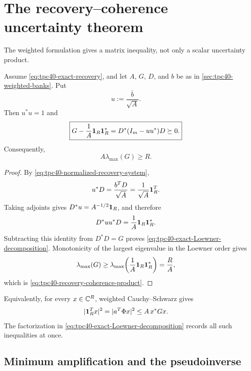 \section{The recovery--coherence uncertainty theorem}
\label{sec:tpc40-recovery-coherence}

The weighted formulation gives a matrix inequality, not only a scalar
uncertainty product.

\begin{theorem}
\label{thm:tpc40-weighted-Loewner}
Assume \eqref{eq:tpc40-exact-recovery}, and let \(A\), \(G\), \(D\), and
\(b\) be as in \cref{sec:tpc40-weighted-banks}.  Put
\begin{equation}
 u:=\frac{\overline b}{\sqrt A}.
 \label{eq:tpc40-Loewner-unit-vector}
\end{equation}
Then \(u^*u=1\) and
\begin{equation}
 \boxed{
 G-\frac1A\mathbf 1_R\mathbf 1_R^*
 =D^*(I_m-uu^*)D\succeq0.}
 \label{eq:tpc40-exact-Loewner-decomposition}
\end{equation}
Consequently,
\begin{equation}
 \boxed{A\lambda_{\max}(G)\ge R.}
 \label{eq:tpc40-recovery-coherence-product}
\end{equation}
\end{theorem}

\begin{proof}
By \eqref{eq:tpc40-normalized-recovery-system},
\[
 u^*D=\frac{b^TD}{\sqrt A}
     =\frac1{\sqrt A}\mathbf 1_R^T.
\]
Taking adjoints gives \(D^*u=A^{-1/2}\mathbf 1_R\), and therefore
\[
 D^*uu^*D=\frac1A\mathbf 1_R\mathbf 1_R^*.
\]
Subtracting this identity from \(D^*D=G\) proves
\eqref{eq:tpc40-exact-Loewner-decomposition}.  Monotonicity of the largest
eigenvalue in the Loewner order gives
\[
 \lambda_{\max}(G)
 \ge\lambda_{\max}\!\left(\frac1A\mathbf 1_R\mathbf 1_R^*\right)
 =\frac RA,
\]
which is \eqref{eq:tpc40-recovery-coherence-product}.
\end{proof}

Equivalently, for every \(x\in\mathbb C^R\), weighted Cauchy--Schwarz gives
\begin{equation}
 |\mathbf 1_R^Tx|^2
 =|a^T\Phi x|^2
 \le A\,x^*Gx.
 \label{eq:tpc40-weighted-Cauchy-form}
\end{equation}
The factorization in \eqref{eq:tpc40-exact-Loewner-decomposition} records
all such inequalities at once.

\subsection{Minimum amplification and the pseudoinverse}

